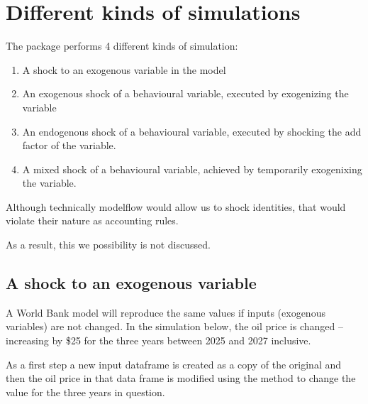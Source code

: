 \documentclass[letterpaper,10pt,english]{jupyterBook}
\begin{document}
\section{Different kinds of simulations}
\label{\detokenize{content/05_WBModels/ScenarioAnalysis:different-kinds-of-simulations}}
\sphinxAtStartPar
The  package performs 4 different kinds of simulation:
\begin{enumerate}
%
\item {} 
\sphinxAtStartPar
A shock to an exogenous variable in the model

\item {} 
\sphinxAtStartPar
An exogenous shock of a behavioural variable, executed by exogenizing the variable

\item {} 
\sphinxAtStartPar
An endogenous shock of a behavioural variable, executed by shocking the add factor of the variable.

\item {} 
\sphinxAtStartPar
A mixed shock of a behavioural variable, achieved by temporarily exogenixing the variable.

\end{enumerate}

\sphinxAtStartPar
Although technically modelflow would allow us to shock identities, that would violate their nature as accounting rules. 

\sphinxAtStartPar
As a result, this we possibility is not discussed.


\subsection{A shock to an exogenous variable}
\label{\detokenize{content/05_WBModels/ScenarioAnalysis:a-shock-to-an-exogenous-variable}}
\sphinxAtStartPar
A World Bank model will reproduce the same values if inputs (exogenous variables) are not changed.  In the simulation below, the oil price is changed – increasing by \$25 for the three years between 2025 and 2027 inclusive.

\sphinxAtStartPar
As a first step a new input dataframe is created as a copy of the original and then the oil price in that data frame is modified using the  method to change the value for the three years in question.
\end{document}
